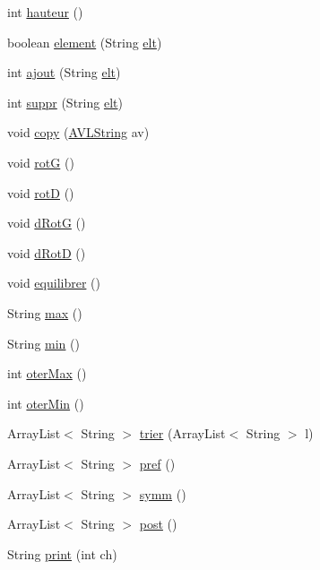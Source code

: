 \begin{DoxyCompactItemize}
\item 
int \hyperlink{class_a_v_l_string_aa452d84d47b7bf724362d5f856be3374}{hauteur} ()
\item 
boolean \hyperlink{class_a_v_l_string_abd6d41261357b2501fc805216f6eb456}{element} (String \hyperlink{class_a_v_l_string_a04e9b58049f335c818886b69ae3ececc}{elt})
\item 
int \hyperlink{class_a_v_l_string_a450d8ec3c60cf1a989f03112f4b9855d}{ajout} (String \hyperlink{class_a_v_l_string_a04e9b58049f335c818886b69ae3ececc}{elt})
\item 
int \hyperlink{class_a_v_l_string_a1f73174ef1b9a223d94e44719cc6736f}{suppr} (String \hyperlink{class_a_v_l_string_a04e9b58049f335c818886b69ae3ececc}{elt})
\item 
void \hyperlink{class_a_v_l_string_a738d9b71bb2ee680c2bebe547da683e7}{copy} (\hyperlink{class_a_v_l_string}{A\-V\-L\-String} av)
\item 
void \hyperlink{class_a_v_l_string_ad960ebcc3991cb679add72f3dda4caa0}{rot\-G} ()
\item 
void \hyperlink{class_a_v_l_string_a16e45537a756d78a0f54020e4ca3dd82}{rot\-D} ()
\item 
void \hyperlink{class_a_v_l_string_ae9bb040328e2fe9a02ae68178231cf41}{d\-Rot\-G} ()
\item 
void \hyperlink{class_a_v_l_string_a6234278e0d2587d5f899dc003c7d1de6}{d\-Rot\-D} ()
\item 
void \hyperlink{class_a_v_l_string_afd90cb3564177a7a37056164d039b0dd}{equilibrer} ()
\item 
String \hyperlink{class_a_v_l_string_aa1d9f436aa7766d5ec0498454f32dfe9}{max} ()
\item 
String \hyperlink{class_a_v_l_string_a9535c4d4517a1103149b348e1126765d}{min} ()
\item 
int \hyperlink{class_a_v_l_string_a5d47afdb15e0cf57f7e27c2f1e1a3c3d}{oter\-Max} ()
\item 
int \hyperlink{class_a_v_l_string_a4bb66e491eccfc0531239f57bf9b01f1}{oter\-Min} ()
\item 
Array\-List$<$ String $>$ \hyperlink{class_a_v_l_string_abe38e3948352fcffc2db0f066c3b97cf}{trier} (Array\-List$<$ String $>$ l)
\item 
Array\-List$<$ String $>$ \hyperlink{class_a_v_l_string_aa8e9250c0b5719b2f197e24c4be4b9e8}{pref} ()
\item 
Array\-List$<$ String $>$ \hyperlink{class_a_v_l_string_a0efe1dbea6307856f3b727df8663b66f}{symm} ()
\item 
Array\-List$<$ String $>$ \hyperlink{class_a_v_l_string_a11601b5dbb6e37215708938323364af7}{post} ()
\item 
String \hyperlink{class_a_v_l_string_adde3aa65616bf1c05ea2407ea8cb255f}{print} (int ch)
\end{DoxyCompactItemize}
